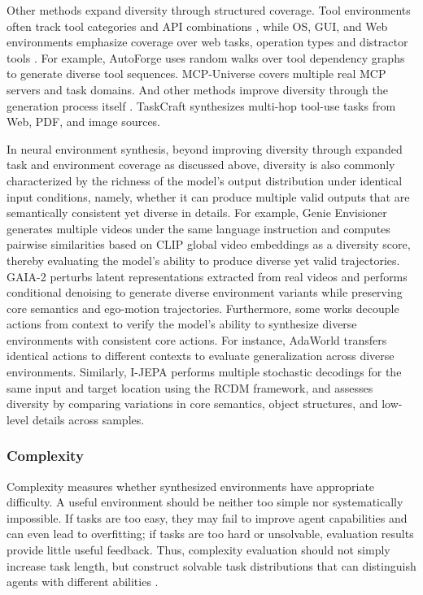 Other methods expand diversity through structured coverage. Tool environments often track tool categories and API combinations \cite{ToolBench, API-Bank}, while OS, GUI, and Web environments emphasize coverage over web tasks, operation types and distractor tools \cite{Mind2Web, WebArena, Mobile-Env}. For example, AutoForge \cite{AutoForge} uses random walks over tool dependency graphs to generate diverse tool sequences. MCP-Universe \cite{MCP-Universe} covers multiple real MCP servers and task domains. And other methods improve diversity through the generation process itself \cite{AgentBench, AI_GAMESTORE}. TaskCraft \cite{TaskCraft} synthesizes multi-hop tool-use tasks from Web, PDF, and image sources.

In neural environment synthesis, beyond improving diversity through expanded task and environment coverage as discussed above, diversity is also commonly characterized by the richness of the model’s output distribution under identical input conditions, namely, whether it can produce multiple valid outputs that are semantically consistent yet diverse in details. For example, Genie Envisioner \cite{Genie_Envisioner} generates multiple videos under the same language instruction and computes pairwise similarities based on CLIP global video embeddings as a diversity score, thereby evaluating the model’s ability to produce diverse yet valid trajectories. GAIA-2 \cite{GAIA-2} perturbs latent representations extracted from real videos and performs conditional denoising to generate diverse environment variants while preserving core semantics and ego-motion trajectories. Furthermore, some works decouple actions from context to verify the model's ability to synthesize diverse environments with consistent core actions. For instance, AdaWorld \cite{AdaWorld} transfers identical actions to different contexts to evaluate generalization across diverse environments. Similarly, I-JEPA \cite{I-JEPA} performs multiple stochastic decodings for the same input and target location using the RCDM framework, and assesses diversity by comparing variations in core semantics, object structures, and low-level details across samples.


\subsubsection{Complexity}

Complexity measures whether synthesized environments have appropriate difficulty. A useful environment should be neither too simple nor systematically impossible. If tasks are too easy, they may fail to improve agent capabilities and can even lead to overfitting; if tasks are too hard or unsolvable, evaluation results provide little useful feedback. Thus, complexity evaluation should not simply increase task length, but construct solvable task distributions that can distinguish agents with different abilities \cite{AgentSynth, TaskCraft, VeriEnv}.

